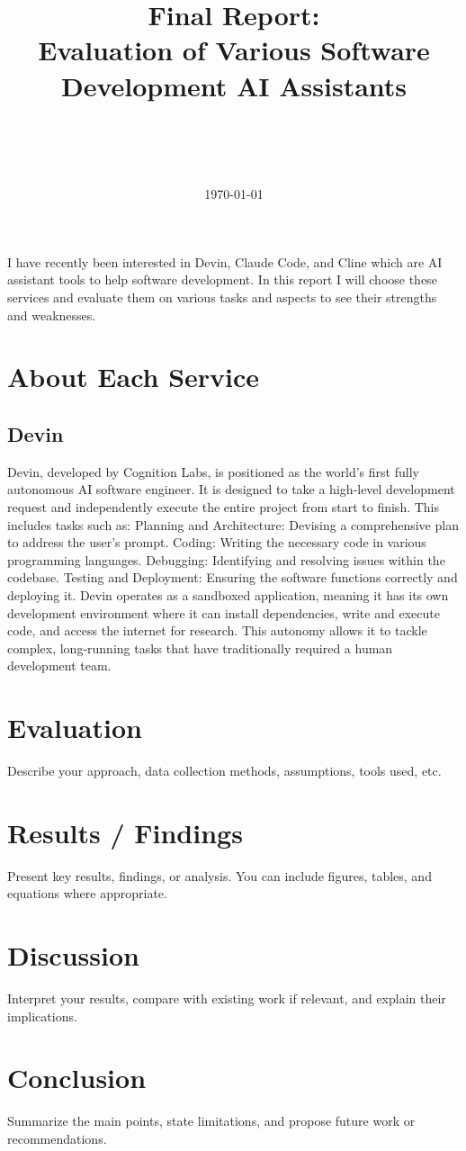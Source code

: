 \documentclass[12pt]{article}
\title{\textbf{Final Report:\\Evaluation of Various Software Development AI Assistants}}
\author{
    \makebox[\textwidth][c]{\textbf{Luna Sugiyama}} \\
    \makebox[\textwidth][c]{Graduate School of Information Science and Technology} \\
    \makebox[\textwidth][c]{Information and Communication Engineering} \\
    \makebox[\textwidth][c]{\texttt{lunagracesugiyama@g.ecc.u-tokyo.ac.jp}}
}
\date{\today}
\begin{document}
\maketitle
\thispagestyle{fancy}
I have recently been interested in Devin, Claude Code, and Cline which are AI assistant tools to help software development.
In this report I will choose these services and evaluate them on various tasks and aspects to see their strengths and weaknesses.

\section{About Each Service}
\subsection{Devin~\cite{devin2024}~\cite{vibecoding}}
Devin, developed by Cognition Labs, is positioned as the world's first fully autonomous AI software engineer. It is designed to take a high-level development request and independently execute the entire project from start to finish. This includes tasks such as:
Planning and Architecture: Devising a comprehensive plan to address the user's prompt.
Coding: Writing the necessary code in various programming languages.
Debugging: Identifying and resolving issues within the codebase.
Testing and Deployment: Ensuring the software functions correctly and deploying it.
Devin operates as a sandboxed application, meaning it has its own development environment where it can install dependencies, write and execute code, and access the internet for research. This autonomy allows it to tackle complex, long-running tasks that have traditionally required a human development team.

\section{Evaluation}
Describe your approach, data collection methods, assumptions, tools used, etc.

\section{Results / Findings}
Present key results, findings, or analysis. You can include figures, tables, and equations where appropriate.

\section{Discussion}
Interpret your results, compare with existing work if relevant, and explain their implications.

\section{Conclusion}
Summarize the main points, state limitations, and propose future work or recommendations.


\end{document}

